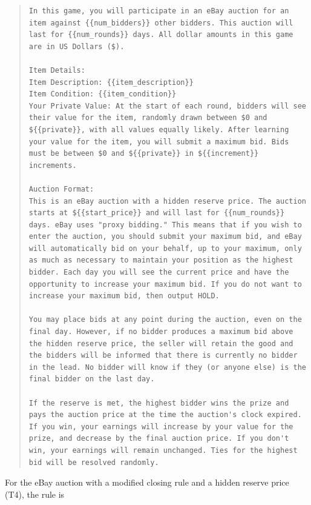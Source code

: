 \documentclass{article} %
\begin{document}
\begin{quote}
\begin{lstlisting}[basicstyle=\ttfamily, breaklines=true]
In this game, you will participate in an eBay auction for an item against {{num_bidders}} other bidders. This auction will last for {{num_rounds}} days. All dollar amounts in this game are in US Dollars ($).

Item Details:
Item Description: {{item_description}}
Item Condition: {{item_condition}}
Your Private Value: At the start of each round, bidders will see their value for the item, randomly drawn between $0 and ${{private}}, with all values equally likely. After learning your value for the item, you will submit a maximum bid. Bids must be between $0 and ${{private}} in ${{increment}} increments.

Auction Format:
This is an eBay auction with a hidden reserve price. The auction starts at ${{start_price}} and will last for {{num_rounds}} days. eBay uses "proxy bidding." This means that if you wish to enter the auction, you should submit your maximum bid, and eBay will automatically bid on your behalf, up to your maximum, only as much as necessary to maintain your position as the highest bidder. Each day you will see the current price and have the opportunity to increase your maximum bid. If you do not want to increase your maximum bid, then output HOLD.

You may place bids at any point during the auction, even on the final day. However, if no bidder produces a maximum bid above the hidden reserve price, the seller will retain the good and the bidders will be informed that there is currently no bidder in the lead. No bidder will know if they (or anyone else) is the final bidder on the last day.

If the reserve is met, the highest bidder wins the prize and pays the auction price at the time the auction's clock expired. If you win, your earnings will increase by your value for the prize, and decrease by the final auction price. If you don't win, your earnings will remain unchanged. Ties for the highest bid will be resolved randomly.\end{lstlisting}
\end{quote}

For the eBay auction with a modified closing rule and a hidden reserve price (T4), the rule is
\end{document}
